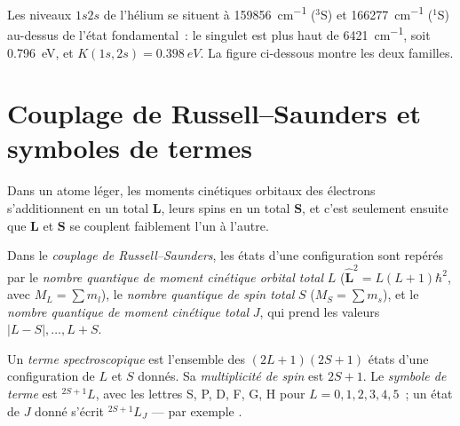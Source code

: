 \begin{example}\label{ex:b3:many-electron-atoms:K}
Les niveaux $1s2s$ de l'hélium se situent à \qty{159856}{cm^{-1}} (${}^3$S) et
\qty{166277}{cm^{-1}} (${}^1$S) au-dessus de l'état fondamental~: le
singulet est plus haut de
\qty{6421}{cm^{-1}}, soit \qty{0.796}{eV}, et $K(1s,2s) = \qty{0.398}{eV}$.
La figure ci-dessous montre les deux familles.
\end{example}

\section{Couplage de Russell--Saunders et symboles de termes}

Dans un atome léger, les moments cinétiques orbitaux des électrons
s'additionnent en un total $\mathbf L$, leurs spins en un total
$\mathbf S$, et c'est seulement ensuite que
$\mathbf L$ et $\mathbf S$ se couplent faiblement l'un à l'autre.

\begin{definition}\label{def:b3:many-electron-atoms:russell-saunders}
Dans le \emph{couplage de Russell--Saunders}, les
états d'une configuration sont repérés par le \emph{nombre quantique de
moment cinétique orbital total}
$L$ ($\hat{\mathbf L}^2 = L(L+1)\hbar^2$, avec $M_L = \sum m_l$), le
\emph{nombre quantique de spin total} $S$ ($M_S = \sum m_s$),
et le \emph{nombre quantique de moment cinétique total}
$J$, qui prend les valeurs $|L - S|, \dots, L + S$.
\end{definition}

\begin{definition}\label{def:b3:many-electron-atoms:term}
Un \emph{terme spectroscopique} est l'ensemble
des
$(2L+1)(2S+1)$ états d'une configuration de $L$ et $S$ donnés. Sa
\emph{multiplicité de spin} est $2S + 1$. Le \emph{symbole de terme}
 est ${}^{2S+1}L$, avec les lettres S, P, D, F, G, H
pour $L = 0, 1, 2, 3, 4, 5$~; un état de $J$ donné s'écrit ${}^{2S+1}L_J$ ---
par exemple .
\end{definition}

